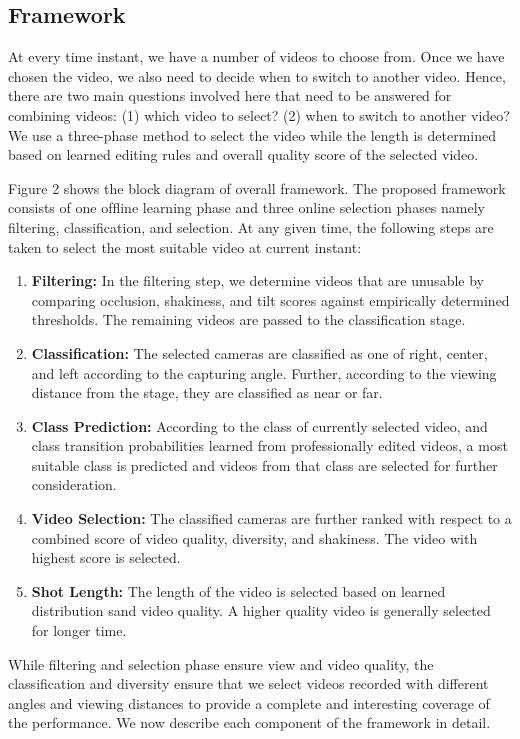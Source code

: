 \documentclass{sig-alternate}
\begin{document}
\subsection{Framework}
At every time instant, we have a number of videos to choose from. Once we have chosen the video, we also need to decide when to switch to another video. Hence, there are two main questions involved here that need to be answered for combining videos: (1) which video to select? (2) when to switch to another video? We use a three-phase method to select the video while the length is determined based on learned editing rules and overall quality score of the selected video. 

Figure 2 shows the block diagram of overall framework. The proposed framework consists of one ofﬂine learning phase and three online selection phases namely ﬁltering, classiﬁcation, and selection. At any given time, the following steps are taken to select the most suitable video at current instant:

\begin{enumerate}
\item  \textbf{Filtering:} In the ﬁltering step, we determine videos that are unusable by comparing occlusion, shakiness, and tilt scores against empirically determined thresholds. The remaining videos are passed to the classiﬁcation stage.
\item \textbf{Classiﬁcation:} The selected cameras are classiﬁed as one of right, center, and left according to the capturing angle. Further, according to the viewing distance from the stage, they are classiﬁed as near or far.
\item \textbf{Class Prediction:} According to the class of currently selected video, and class transition probabilities learned from professionally edited videos, a most suitable class is predicted and videos from that class are selected for further consideration.
\item \textbf{Video Selection:} The classiﬁed cameras are further ranked with respect to a combined score of video quality, diversity, and shakiness. The video with highest score is selected.
\item \textbf{Shot Length:} The length of the video is selected based on learned distribution sand video quality. A higher quality video is generally selected for longer time.
\end{enumerate}

While filtering and selection phase ensure view and video quality, the classification and diversity ensure that we select videos recorded with different angles and viewing distances to provide a complete and interesting coverage of the performance. We now describe each component of the framework in detail.
\end{document}
